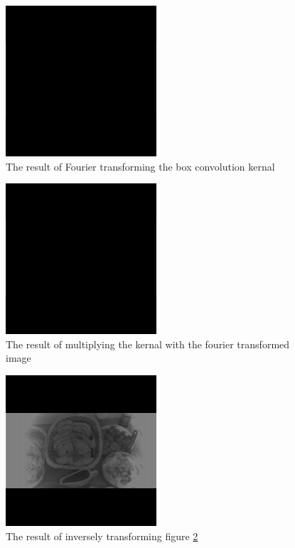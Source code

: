 \documentclass{article}
\begin{document}
\begin{figure}[H]
    \centering
    \caption{The result of Fourier transforming the box convolution kernal}
    \label{fig:fourierBox}
    \includegraphics[width=0.5\textwidth]{fourier_rect_image.png}
\end{figure}

\begin{figure}[H]
    \centering
    \caption{The result of multiplying the kernal with the fourier transformed image}
    \label{fig:boxMultiply}
    \includegraphics[width=0.5\textwidth]{convolution_image.png}
\end{figure}

\begin{figure}[H]
    \centering
    \caption{The result of inversely transforming figure \ref{fig:boxMultiply}}
    \label{fig:fourierMultiply}
    \includegraphics[width=0.5\textwidth]{double_inverse_fourier_image.png}
\end{figure}
\end{document}
